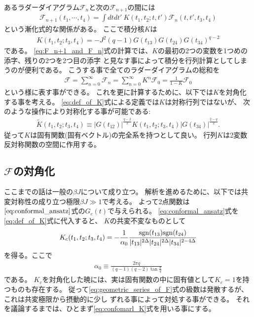 あるラダーダイアグラム$\mathcal{F}_n$と次の$\mathcal{F}_{n+1}$の間には
\begin{align}
	\mathcal{F}_{n+1}(t_1, \cdots, t_4)
	= \int dtdt'\ K(t_1, t_2; t, t')\mathcal{F}_n(t, t', t_3, t_4)
	\label{eq:F_n+1_and_F_n}
\end{align}
という漸化式的な関係がある。
ここで積分核$K$は
\begin{align}
	K(t_1, t_2; t_3, t_4) = -J^2(q-1)G(t_{13})G(t_{24})G(t_{34})^{q-2}
	\label{eq:def_of_K}
\end{align}
である。
\eqref{eq:F_n+1_and_F_n}式の計算では、$K$の最初の2つの変数を1つめの添字、残りの2つを2つ目の添字
と見なす事によって積分を行列計算としてしまうのが便利である。
こうする事で全てのラダーダイアグラムの総和を
\begin{align}
	\mathcal{F}
	= \sum_{n=0}^{\infty}\mathcal{F}_n
	= \sum_{n=0}^{\infty}K^n \mathcal{F}_0
	= \frac{1}{1 - K}\mathcal{F}_0
	\label{eq:geometric_series_of_F}
\end{align}
という様に表す事ができる。
これを更に計算するために、以下では$K$を対角化する事を考える。
\eqref{eq:def_of_K}式による定義では$K$は対称行列ではないが、
次のような操作により対称化する事が可能である:
\begin{align}
	\tilde{K}(t_1, t_2; t_3, t_4) \equiv
	|G(t_{12})|^{\frac{q-2}{2}}K(t_1, t_2; t_3, t_4)|G(t_{34})|^{\frac{2-q}{2}}.
\end{align}
従って$K$は固有関数(固有ベクトル)の完全系を持つとして良い。
行列$K$は2変数反対称関数の空間に作用する。

\subsection{$\mathcal{F}$の対角化}
ここまでの話は一般の$\beta J$について成り立つ。
解析を進めるために、以下では共変対称性の成り立つ極限$\beta J \gg 1$で考える。
よって2点関数は$\eqref{eq:conformal_ansatz}$式の$G_c(t)$で与えられる。
\eqref{eq:conformal_ansatz}式を\eqref{eq:def_of_K}式に代入すると、
$K$の共変不変なものとして
\begin{align}
	K_c(t_1, t_2; t_3, t_4)
	= -\frac{1}{\alpha_0}
		\frac{\mathrm{sgn}(t_{13})\mathrm{sgn}(t_{24})}{|t_{13}|^{2\Delta}|t_{24}|^{2\Delta}|t_{34}|^{2-4\Delta}}
	\label{eq:confomarl_K}
\end{align}
を得る。ここで
\begin{align}
	\alpha_0 \equiv \frac{2\pi q}{(q-1)(q-2)\tan\frac{\pi}{q}}
\end{align}
である。
$K_c$を対角化した暁には、実は固有関数の中に固有値として$K_c = 1$を持つものも存在する。
従って\eqref{eq:geometric_series_of_F}式の級数は発散するが、これは共変極限から摂動的に少し
ずれる事によって対処する事ができる。
それを議論するまでは、ひとまず\eqref{eq:confomarl_K}式を用いる事にする。

